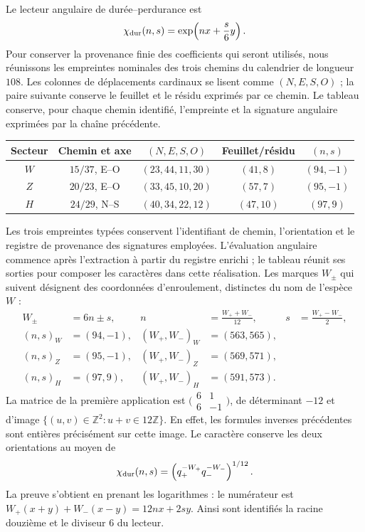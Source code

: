 Le lecteur angulaire de durée--perdurance est
\begin{equation}
 \chi_{\rm dur}(n,s)=\exp\!\left(nx+\frac{s}{6}y\right).
 \label{amp-higgs-caracter}
\end{equation}
Pour conserver la provenance finie des coefficients qui seront utilisés,
nous réunissons les empreintes nominales des trois chemins du calendrier de longueur
$108$. Les colonnes de déplacements cardinaux se lisent comme $(N,E,S,O)$ ;
la paire suivante conserve le feuillet et le résidu exprimés par ce chemin.
Le tableau conserve, pour chaque chemin identifié, l’empreinte et la signature
angulaire exprimées par la chaîne précédente.
\begin{center}
\small
\begin{tabular}{c c c c c}
\hline
Secteur & Chemin et axe & $(N,E,S,O)$ & Feuillet/résidu & $(n,s)$\\
\hline
$W$ & $15/37$, E--O & $(23,44,11,30)$ & $(41,8)$ & $(94,-1)$\\
$Z$ & $20/23$, E--O & $(33,45,10,20)$ & $(57,7)$ & $(95,-1)$\\
$H$ & $24/29$, N--S & $(40,34,22,12)$ & $(47,10)$ & $(97,9)$\\
\hline
\end{tabular}
\end{center}
Les trois empreintes typées conservent l’identifiant de chemin, l’orientation
et le registre de provenance des signatures employées. L’évaluation angulaire
commence après l’extraction à partir du registre enrichi ; le tableau
réunit ses sorties pour composer les caractères dans cette réalisation.
Les marques $W_\pm$ qui suivent désignent des coordonnées d’enroulement,
distinctes du nom de l’espèce $W$ :
\begin{equation}
 \begin{aligned}
 W_\pm&=6n\pm s, &
 n&=\frac{W_++W_-}{12},& s&=\frac{W_+-W_-}{2},\\
 (n,s)_W&=(94,-1), & (W_+,W_-)_W&=(563,565),\\
 (n,s)_Z&=(95,-1), & (W_+,W_-)_Z&=(569,571),\\
 (n,s)_H&=(97,9), & (W_+,W_-)_H&=(591,573).
 \end{aligned}
 \label{amp-higgs-firmas}
\end{equation}
La matrice de la première application est
$\bigl(\begin{smallmatrix}6&1\\6&-1\end{smallmatrix}\bigr)$, de déterminant
$-12$ et d’image $\{(u,v)\in\mathbb Z^2:u+v\in12\mathbb Z\}$.
En effet, les formules inverses précédentes sont entières précisément sur
cette image. Le caractère conserve les deux orientations au moyen de
\begin{equation}
 \chi_{\rm dur}(n,s)
 =\left(q_+^{-W_+}q_-^{-W_-}\right)^{1/12}.
 \label{amp-higgs-caracter-canales}
\end{equation}
La preuve s’obtient en prenant les logarithmes : le numérateur est
$W_+(x+y)+W_-(x-y)=12nx+2sy$.
Ainsi sont identifiés la racine douzième et le diviseur $6$ du lecteur.

